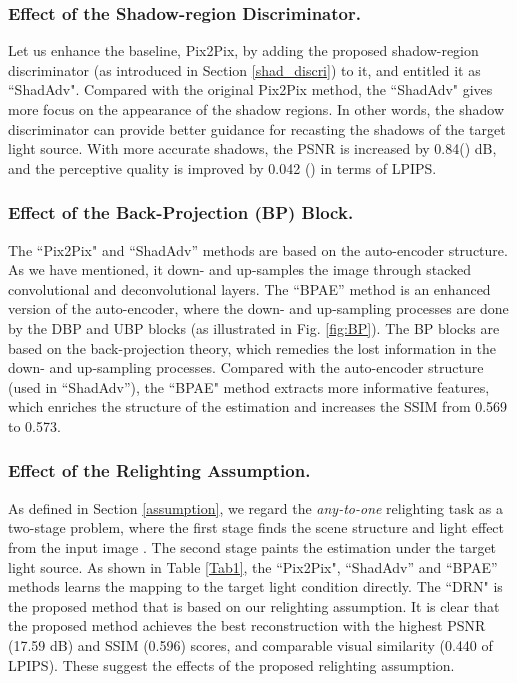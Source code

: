 \documentclass[runningheads]{llncs}
\begin{document}
\subsubsection{Effect of the Shadow-region Discriminator.} Let us enhance the baseline, Pix2Pix, by adding the proposed shadow-region discriminator (as introduced in Section \ref{shad_discri}) to it, and entitled it as ``ShadAdv". Compared with the original Pix2Pix method, the ``ShadAdv" gives more focus on the appearance of the shadow regions. In other words, the shadow discriminator can provide better guidance for recasting the shadows of the target light source. With more accurate shadows, the PSNR is increased by 0.84() dB, and the perceptive quality is improved by 0.042 () in terms of LPIPS.  

\vskip -0.5cm
\baselineskip
\subsubsection{Effect of the Back-Projection (BP) Block.} The ``Pix2Pix" and ``ShadAdv'' methods are based on the auto-encoder structure. As we have mentioned, it down- and up-samples the image through stacked convolutional and deconvolutional layers. The ``BPAE'' method is an enhanced version of the auto-encoder, where the down- and up-sampling processes are done by the DBP and UBP blocks (as illustrated in Fig. \ref{fig:BP}). The BP blocks are based on the back-projection theory, which remedies the lost information in the down- and up-sampling processes. Compared with the auto-encoder structure (used in ``ShadAdv''), the ``BPAE" method extracts more informative features, which enriches the structure of the estimation and increases the SSIM from 0.569 to 0.573.

\vskip -0.5cm
\baselineskip
\subsubsection{Effect of the Relighting Assumption.} 

As defined in Section \ref{assumption}, we regard the \textit{any-to-one} relighting task as a two-stage problem, where the first stage finds the scene structure  and light effect  from the input image . The second stage paints  the estimation  under the target light source. As shown in Table \ref{Tab1}, the ``Pix2Pix", ``ShadAdv'' and ``BPAE'' methods learns the mapping to the target light condition directly. The ``DRN" is the proposed method that is based on our relighting assumption. It is clear that the proposed method achieves the best reconstruction with the highest PSNR (17.59 dB) and SSIM (0.596) scores, and comparable visual similarity (0.440 of LPIPS). These suggest the effects of the proposed relighting assumption.  
\end{document}
